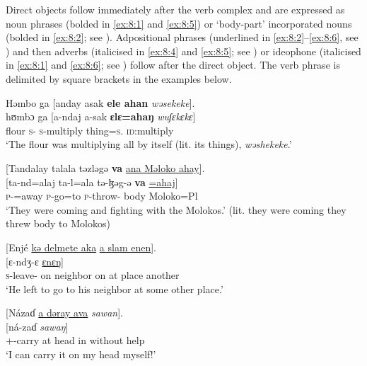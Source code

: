 Direct objects follow immediately after the verb complex and are expressed as noun phrases (bolded in \ref{ex:8:1} and \ref{ex:8:5}) or ‘body-part’ incorporated nouns (bolded in \ref{ex:8:2}; see ). Adpositional phrases (underlined in \ref{ex:8:2}--\ref{ex:8:6}, see ) and then adverbs (italicised in \ref{ex:8:4} and \ref{ex:8:5}; see ) or ideophone (italicised in \ref{ex:8:1} and \ref{ex:8:6}; see ) follow after the direct object. The verb phrase is delimited by square brackets in the examples below.

\ea \label{ex:8:1}
Həmbo  ga  [anday  asak {\textbf{ele ahan}} \textit{wəsekeke}].\\
\gll hʊmbɔ  ga  [a-ndaj    a-sak    \textbf{ɛlɛ}\textbf{=ahaŋ}  \textit{wuʃɛkɛkɛ}]\\
      flour  {\ADJ}  \textsc{s}-{\PRG}    \textsc{s}-multiply  thing=\textsc{s}.{\POSS} \textsc{id}:multiply\\
\glt ‘The flour was multiplying all by itself (lit. its things), \textit{wəshekeke}.’
\z

\ea \label{ex:8:2}
{}[Tandalay  talala  təzləgə   {\textbf{va}} \underline{ana Məloko ahay}].\\
\gll  {}[ta-nd=alaj    ta-l=ala  tə-ɮəg-ə   {\textbf{va}}    \uline{=ahaj}]\\
      \textsc{p}-{\PRG}=away   \textsc{p}-go=to  \textsc{p}-throw-{\CL} body  {\DAT} Moloko=Pl\\
\glt  ‘They were coming and fighting with the Molokos.’ (lit. they were coming they threw body to Molokos)
\z

\ea \label{ex:8:3}
{}[Enjé  \underline{kə  delmete  aka}  \underline{a  slam  enen}].\\
\gll  {}[ɛ-ndʒ{}-ɛ             \uline{ɛnɛŋ}]\\
      \textsc{s}-leave-{\CL}    on  neighbor    on  at  place  another\\
\glt  ‘He left to go to his neighbor at some other place.’  
\z

\ea \label{ex:8:4}
{}[Názaɗ  \underline{a  dəray  ava}  \textit{sawan}].\\
\gll  {}[ná-zaɗ           \textit{sawaŋ}]\\
      {\oneS}+{\IFV}-carry    at  head  in  {without help}\\
\glt  ‘I can carry it on my head myself!’
\z


